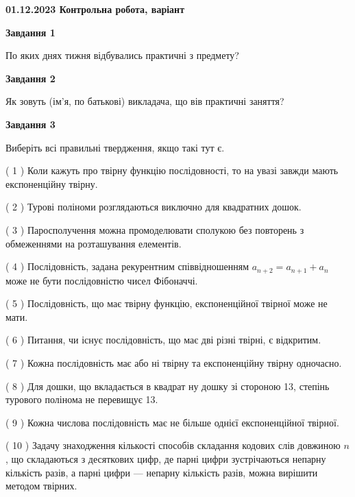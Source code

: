 \documentclass[12pt, ukrainian]{article}
\begin{document}
\begin {large}

\textbf{01.12.2023 Контрольна робота, варіант  }\par


{
{\begin {center}\textbf{Завдання 1}\end {center}}\par
По яких днях тижня відбувались практичні з предмету?\par
{\begin {center}\textbf{Завдання 2}\end {center}}\par
Як зовуть (ім'я, по батькові) викладача, що вів практичні заняття?\par
{\begin {center}\textbf{Завдання 3}\end {center}}\par
Виберіть всі правильні твердження, якщо такі тут є.\par
\vspace{2mm}
( 1 ) Коли кажуть про твірну функцію послідовності, то на увазі завжди мають експоненційну твірну.%

( 2 ) Турові поліноми розглядаються виключно для квадратних дошок.%

( 3 ) Паросполучення можна промоделювати сполукою без повторень з обмеженнями на розташування елементів.%

( 4 ) Послідовність, задана рекурентним співвідношенням $a_{n+2}=a_{n+1}+a_{n}$ може не бути послідовністю чисел Фібоначчі.%

( 5 ) Послідовність, що має твірну функцію, експоненційної твірної може не мати.%

( 6 ) Питання, чи існує послідовність, що має дві різні твірні, є відкритим.%

( 7 ) Кожна послідовність має або ні твірну та експоненційну твірну одночасно.%

( 8 ) Для дошки, що вкладається в квадрат ну дошку зі стороною 13, степінь турового полінома не перевищує 13.%

( 9 ) Кожна числова послідовність має не більше однієї  експоненційної твірної.%

( 10 ) Задачу знаходження кількості способів складання кодових слів довжиною $n$, що складаються з десяткових цифр, де парні цифри зустрічаються непарну кількість разів, а парні цифри — непарну кількість разів, можна вирішити методом твірних.%
}
\end {large}

\vspace{4mm}
\newpage
\end{document}
